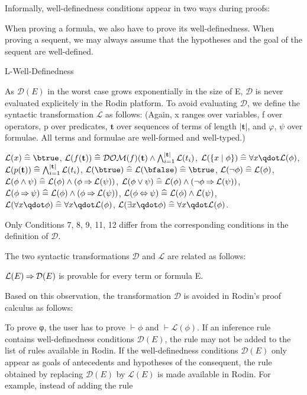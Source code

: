Informally, well-definedness conditions appear in two ways during proofs:

    When proving a formula, we also have to prove its well-definedness.
    When proving a sequent, we may always assume that the hypotheses and the goal of the sequent are well-defined. 

L-Well-Definedness

As $\mathcal{D}(E)$ in the worst case grows exponentially in the size of E, $\mathcal{D}$ is never evaluated explicitely in the Rodin platform. To avoid evaluating $\mathcal{D}$, we define the syntactic transformation $\mathcal{L}$ as follows:
(Again, x ranges over variables, f over operators, p over predicates, $\mathbf{t}$ over sequences of terms of length $|\mathbf{t}|$, and $φ$, $ψ$ over formulae. All terms and formulae are well-formed and well-typed.)

    $\mathcal{L}(x)\defi \btrue$,
    $\mathcal{L}(f(\mathbf{t}))\mathrel{\widehat=} \mathcal{DOM}(f)(\mathbf{t}) \land \bigwedge_{i=1}^{|\mathbf{t}|} \mathcal{L}(t_i)$,
    $\mathcal{L}(\{x\mid \phi\})\defi \forall x\qdot \mathcal{L}(\phi)$,
    $\mathcal{L}(p(\mathbf{t}))\mathrel{\widehat=} \bigwedge_{i=1}^{|\mathbf{t}|} \mathcal{L}(t_i)$,
    $\mathcal{L}(\btrue) \defi \mathcal{L}(\bfalse) \defi \btrue$,
    $\mathcal{L}(\lnot\phi) \mathrel{\widehat=} \mathcal{L}(\phi)$,
    $\mathcal{L}(\phi\land\psi)\mathrel{\widehat=} \mathcal{L}(\phi) \land (\phi \mathbin\Rightarrow \mathcal{L}(\psi))$,
    $\mathcal{L}(\phi\lor\psi)\mathrel{\widehat=} \mathcal{L}(\phi) \land (\lnot\phi \mathbin\Rightarrow \mathcal{L}(\psi))$,
    $\mathcal{L}(\phi\mathbin\Rightarrow\psi)\mathrel{\widehat=} \mathcal{L}(\phi) \land (\phi \mathbin\Rightarrow \mathcal{L}(\psi))$,
    $\mathcal{L}(\phi\mathbin\Leftrightarrow\psi)\mathrel{\widehat=} \mathcal{L}(\phi) \land \mathcal{L}(\psi)$,
    $\mathcal{L}(\forall x\qdot \phi)\defi \forall x\qdot \mathcal{L}(\phi)$,
    $\mathcal{L}(\exists x\qdot \phi)\defi \forall x\qdot \mathcal{L}(\phi)$. 

Only Conditions 7, 8, 9, 11, 12 differ from the corresponding conditions in the definition of $\mathcal{D}$.

The two syntactic transformations $\mathcal{D}$ and $\mathcal{L}$ are related as follows:

    $\mathcal{L}(E) \mathbin\Rightarrow \mathcal{D}(E)$ is provable for every term or formula E.

Based on this observation, the transformation $\mathcal{D}$ is avoided in Rodin's proof calculus as follows:

    To prove φ, the user has to prove $\vdash\phi$ and $\vdash\mathcal{L}(\phi)$.
    If an inference rule contains well-definedness conditions $\mathcal{D}(E)$, the rule may not be added to the list of rules available in Rodin.
        If the well-definedness conditions $\mathcal{D}(E)$ only appear as goals of antecedents and hypotheses of the consequent, the rule obtained by replacing $\mathcal{D}(E)$ by $\mathcal{L}(E)$ is made available in Rodin. For example, instead of adding the rule

